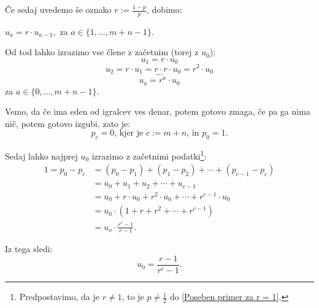 \documentclass[12pt, a4paper]{article}
\begin{document}
Če sedaj uvedemo še oznako $r:=\frac{1-p}{p}$, dobimo:

\centerline{$u_a = r \cdot u_{a-1},$  za $ a \in \{1 , \dotso , m + n-1\}.$}
\bigskip
Od tod lahko izrazimo vse člene z začetnim (torej z $u_0$):
$$u_1 = r \cdot u_0$$
$$u_2 = r \cdot u_1 = r \cdot r \cdot u_0 = r^2 \cdot u_0$$ 
$$\cdots $$
$$u_a = r^a \cdot u_0$$ za $ a \in \{ 0, \dotso , m + n-1\}.$

Vemo, da če ima eden od igralcev ves denar, potem gotovo zmaga, če pa ga nima nič, potem gotovo izgubi, zato je:
$$p_c = 0 \textrm{, kjer je } c := m + n \textrm{, in } p_0 = 1.$$

Sedaj lahko najprej $u_0$ izrazimo z začetnimi podatki\footnote{Predpostavimo, da je $r \neq 1$, to je $p \neq \frac{1}{2}$ do \ref{Poseben primer za r = 1}.}:
\begin{equation*}
\begin{split}
1 = p_0 - p_c &= (p_0 - p_1) + (p_1 - p_2) + \cdots + (p_{c-1} - p_c)  \\
        &= u_0 + u_1 + u_2 + \cdots + u_{c-1}  \\
        &= u_0 + r \cdot u_0 + r^2 \cdot u_0 + \cdots + r^{c-1} \cdot u_0  \\
        &= u_0 \cdot (1 + r + r^2 + \cdots + r^{c-1})  \\
        &= u_o \cdot \frac{r^c - 1}{r-1}.
\end{split}
\end{equation*}  

Iz tega sledi: $$u_0 = \frac{r-1}{r^c -1}.$$
\end{document}
